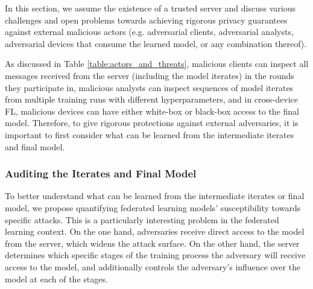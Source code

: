 \documentclass[11pt]{article}
\begin{document}
In this section, we assume the existence of a trusted server and discuss various challenges and open problems towards achieving rigorous privacy guarantees against external malicious actors (e.g. adversarial clients, adversarial analysts, adversarial devices that consume the learned model, or any combination thereof). 

As discussed in Table \ref{table:actors_and_threats}, malicious clients can inspect all messages received from the server (including the model iterates) in the rounds they participate in,  malicious analysts  can inspect sequences of model iterates from multiple training runs with different hyperparameters, and in cross-device FL, malicious devices can have either white-box or black-box access to the final model. Therefore, to give rigorous protections against external adversaries, it is important to first consider what can be learned from the intermediate iterates and final model. 

\subsubsection{Auditing the Iterates and Final Model}
\label{sssec:auditing}

To better understand what can be learned from the intermediate iterates or final model, we  propose quantifying federated learning models' susceptibility towards specific attacks.
This is a particularly interesting problem in the federated learning context. On the one hand, adversaries receive direct access to the model from the server, which widens the attack surface.
On the other hand, the server determines which specific stages of the training process the adversary will receive access to the model, and additionally controls the adversary's influence over the model at each of the stages.
 
\end{document}
